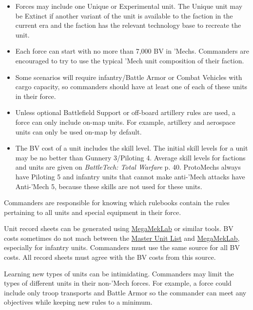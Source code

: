 \begin{itemize}
\item Forces may include one Unique or Experimental unit.
The Unique unit may be Extinct if another variant of the unit is available to the faction in the current era and the faction has the relevant technology base to recreate the unit.

\item Each force can start with no more than 7,000 BV in 'Mechs.
Commanders are encouraged to try to use the typical 'Mech unit composition of their faction.

\item Some scenarios will require infantry/Battle Armor or Combat Vehicles with cargo capacity, so commanders should have at least one of each of these units in their force.

\item Unless optional Battlefield Support or off-board artillery rules are used, a force can only include on-map units.
For example, artillery and aerospace units can only be used on-map by default.

\item The BV cost of a unit includes the skill level.
The initial skill levels for a unit may be no better than Gunnery 3/Piloting 4.
Average skill levels for factions and units are given on \emph{BattleTech: Total Warfare} p. 40.
ProtoMechs always have Piloting 5 and infantry units that cannot make anti-'Mech attacks have Anti-'Mech 5, because these skills are not used for these units.

\end{itemize}

Commanders are responsible for knowing which rulebooks contain the rules pertaining to all units and special equipment in their force.

Unit record sheets can be generated using \href{https://megamek.org}{MegaMekLab} or similar tools.
BV costs sometimes do not mach between the \href{http://www.masterunitlist.info}{Master Unit List} and \href{https://megamek.org}{MegaMekLab}, especially for infantry units.
Commanders must use the same source for all BV costs.
All record sheets must agree with the BV costs from this source.

Learning new types of units can be intimidating.
Commanders may limit the types of different units in their non-'Mech forces.
For example, a force could include only troop transports and Battle Armor so the commander can meet any objectives while keeping new rules to a minimum.

